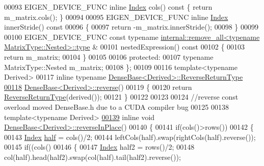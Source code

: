 \begin{DoxyCode}
00093     EIGEN\_DEVICE\_FUNC \textcolor{keyword}{inline} \hyperlink{namespace_eigen_a62e77e0933482dafde8fe197d9a2cfde}{Index} cols()\textcolor{keyword}{ const }\{ \textcolor{keywordflow}{return} m\_matrix.cols(); \}
00094 
00095     EIGEN\_DEVICE\_FUNC \textcolor{keyword}{inline} \hyperlink{namespace_eigen_a62e77e0933482dafde8fe197d9a2cfde}{Index} innerStride()\textcolor{keyword}{ const}
00096 \textcolor{keyword}{    }\{
00097       \textcolor{keywordflow}{return} -m\_matrix.innerStride();
00098     \}
00099 
00100     EIGEN\_DEVICE\_FUNC \textcolor{keyword}{const} \textcolor{keyword}{typename} 
      \hyperlink{group___sparse_core___module}{internal::remove\_all<typename MatrixType::Nested>::type}
      &
00101     nestedExpression()\textcolor{keyword}{ const }
00102 \textcolor{keyword}{    }\{
00103       \textcolor{keywordflow}{return} m\_matrix;
00104     \}
00105 
00106   \textcolor{keyword}{protected}:
00107     \textcolor{keyword}{typename} MatrixType::Nested m\_matrix;
00108 \};
00109 
00116 \textcolor{keyword}{template}<\textcolor{keyword}{typename} Derived>
00117 \textcolor{keyword}{inline} \textcolor{keyword}{typename} \hyperlink{group___core___module_class_eigen_1_1_reverse}{DenseBase<Derived>::ReverseReturnType}
\hyperlink{group___core___module_a38ea394036d8b096abf322469c80198f}{00118} \hyperlink{group___core___module_a38ea394036d8b096abf322469c80198f}{DenseBase<Derived>::reverse}()
00119 \{
00120   \textcolor{keywordflow}{return} \hyperlink{group___core___module_class_eigen_1_1_reverse}{ReverseReturnType}(derived());
00121 \}
00122 
00123 
00124 \textcolor{comment}{//reverse const overload moved DenseBase.h due to a CUDA compiler bug}
00125 
00138 \textcolor{keyword}{template}<\textcolor{keyword}{typename} Derived>
\hyperlink{group___core___module_adb8045155ea45f7961fc2a5170e1d921}{00139} \textcolor{keyword}{inline} \textcolor{keywordtype}{void} \hyperlink{group___core___module_adb8045155ea45f7961fc2a5170e1d921}{DenseBase<Derived>::reverseInPlace}()
00140 \{
00141   \textcolor{keywordflow}{if}(cols()>rows())
00142   \{
00143     \hyperlink{namespace_eigen_a62e77e0933482dafde8fe197d9a2cfde}{Index} \hyperlink{struct_eigen_1_1half}{half} = cols()/2;
00144     leftCols(half).swap(rightCols(half).reverse());
00145     \textcolor{keywordflow}{if}((cols()%
00146     \{
00147       \hyperlink{namespace_eigen_a62e77e0933482dafde8fe197d9a2cfde}{Index} half2 = rows()/2;
00148       col(half).head(half2).swap(col(half).tail(half2).reverse());

\end{DoxyCode}
